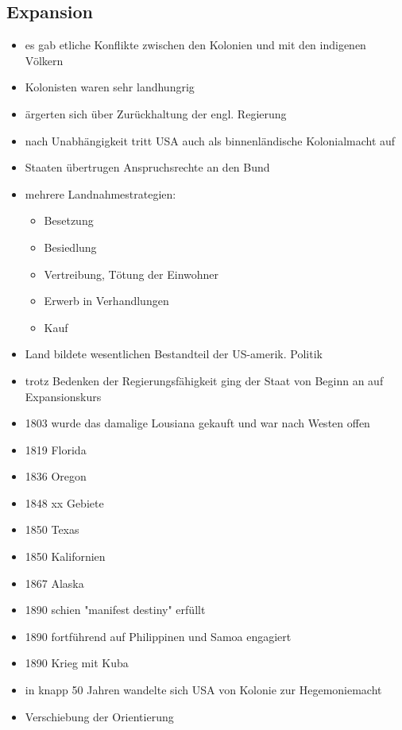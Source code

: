\documentclass[10pt,a4paper,oneside,ngerman,numbers=noenddot]{scrartcl}
\newenvironment{myitemize}{\begin{itemize}\itemsep -8pt}{\end{itemize}} %
\begin{document}
\subsection*{Expansion}
\begin{myitemize}
    \item es gab etliche Konflikte zwischen den Kolonien und mit den indigenen Völkern
    \item Kolonisten waren sehr landhungrig
    \item ärgerten sich über Zurückhaltung der engl. Regierung
    \item nach Unabhängigkeit tritt USA auch als binnenländische Kolonialmacht auf
    \item Staaten übertrugen Anspruchsrechte an den Bund

    \item mehrere Landnahmestrategien:
    \begin{myitemize}
        \item  Besetzung
        \item  Besiedlung
        \item  Vertreibung, Tötung der Einwohner
        \item  Erwerb in Verhandlungen
        \item  Kauf
    \end{myitemize}
    \item Land bildete wesentlichen Bestandteil der US-amerik. Politik
    \item trotz Bedenken der Regierungsfähigkeit ging der Staat von Beginn an auf Expansionskurs
    \item 1803 wurde das damalige Lousiana gekauft und war nach Westen offen
    \item 1819 Florida
    \item 1836 Oregon
    \item 1848 xx Gebiete
    \item 1850 Texas
    \item 1850 Kalifornien
    \item 1867 Alaska
    \item 1890 schien "manifest destiny" erfüllt
    \item 1890 fortführend auf Philippinen und Samoa engagiert
    \item 1890 Krieg mit Kuba
    \item in knapp 50 Jahren wandelte sich USA von Kolonie zur Hegemoniemacht
    \item Verschiebung der Orientierung


\end{myitemize}
\end{document}
